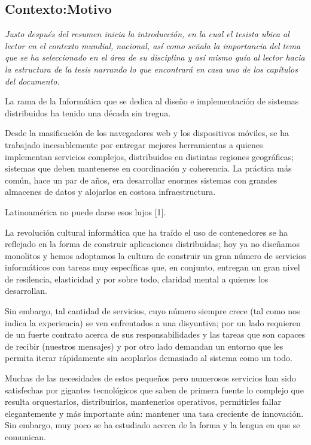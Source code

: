 
\subsection{Contexto:Motivo}
{\it Justo después del resumen inicia la introducción, en la cual el tesista ubica al lector en el contexto mundial, nacional, así como señala la importancia del tema que se ha seleccionado en el área de su disciplina y así mismo guía al lector hacia la estructura de la tesis narrando lo que encontrará en casa uno de los capítulos del documento.}

La rama de la Informática que se dedica al diseño e implementación de sistemas distribuidos ha tenido una década sin tregua.

Desde la masificación de los navegadores web y los dispositivos móviles, se ha trabajado incesablemente por entregar mejores herramientas a quienes implementan servicios complejos, distribuidos en distintas regiones geográficas; sistemas que deben mantenerse en coordinación y coherencia. La práctica más común, hace un par de años, era desarrollar enormes sistemas con grandes almacenes de datos y alojarlos en costosa infraestructura.

Latinoamérica no puede darse esos lujos [1].

La revolución cultural informática que ha traído el uso de contenedores se ha reflejado en la forma de construir aplicaciones distribuidas; hoy ya no diseñamos monolitos y hemos adoptamos la cultura de construir un gran número de servicios informáticos con tareas muy específicas que, en conjunto, entregan un gran nivel de resilencia, elasticidad y por sobre todo, claridad mental a quienes los desarrollan.

Sin embargo, tal cantidad de servicios, cuyo número siempre crece (tal como nos indica la experiencia) se ven enfrentados a una disyuntiva; por un lado requieren de un fuerte contrato acerca de sus responsabilidades y las tareas que son capaces de recibir (nuestros mensajes) y por otro lado demandan un entorno que les permita iterar rápidamente sin acoplarlos demasiado al sistema como un todo.

Muchas de las necesidades de estos pequeños pero numerosos servicios han sido satisfechas por gigantes tecnológicos que saben de primera fuente lo complejo que resulta orquestarlos, distribuirlos, mantenerlos operativos, permitirles fallar elegantemente y más importante aún: mantener una tasa creciente de innovación. Sin embargo, muy poco se ha estudiado acerca de la forma y la lengua en que se comunican.

